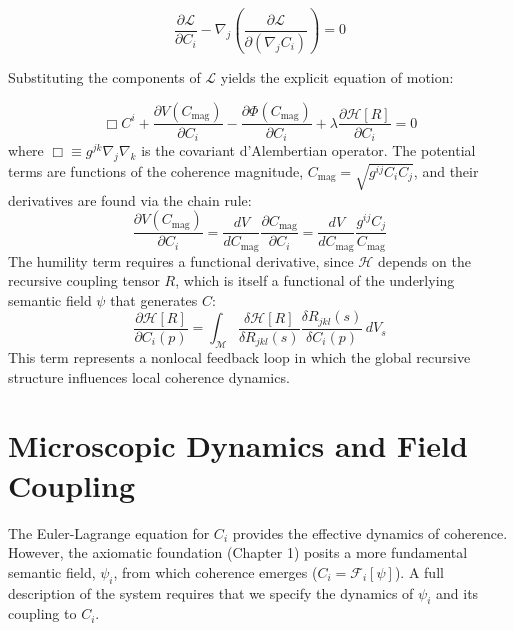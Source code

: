 \begin{equation}
\frac{\partial \mathcal{L}}{\partial C_i} - \nabla_j \left( \frac{\partial \mathcal{L}}{\partial (\nabla_j C_i)} \right) = 0
\end{equation}

Substituting the components of \(\mathcal{L}\) yields the explicit equation of motion:

\begin{equation}
\Box C^i + \frac{\partial V(C_{\mathrm{mag}})}{\partial C_i} - \frac{\partial \Phi(C_{\mathrm{mag}})}{\partial C_i} + \lambda \frac{\partial \mathcal{H}[R]}{\partial C_i} = 0
\end{equation}
where \(\Box \equiv g^{jk}\nabla_j \nabla_k\) is the covariant d'Alembertian operator. The potential terms are functions of the coherence magnitude, \(C_{\text{mag}} = \sqrt{g^{ij} C_i C_j}\), and their derivatives are found via the chain rule:
\begin{equation}
\frac{\partial V(C_{\mathrm{mag}})}{\partial C_i} = \frac{dV}{dC_{\mathrm{mag}}} \frac{\partial C_{\mathrm{mag}}}{\partial C_i} = \frac{dV}{dC_{\mathrm{mag}}} \frac{g^{ij} C_j}{C_{\mathrm{mag}}}
\end{equation}
The humility term requires a functional derivative, since \(\mathcal{H}\) depends on the recursive coupling tensor \(R\), which is itself a functional of the underlying semantic field \(\psi\) that generates \(C\):
\begin{equation}
\frac{\partial \mathcal{H}[R]}{\partial C_i(p)} = \int_{\mathcal{M}} \frac{\delta \mathcal{H}[R]}{\delta R_{jkl}(s)} \frac{\delta R_{jkl}(s)}{\delta C_i(p)} \, dV_s
\end{equation}
This term represents a nonlocal feedback loop in which the global recursive structure influences local coherence dynamics.


\section{Microscopic Dynamics and Field Coupling}
\label{sec:microscopic_dynamics_and_field_coupling}

The Euler-Lagrange equation for \(C_i\) provides the effective dynamics of coherence. However, the axiomatic foundation (Chapter 1) posits a more fundamental semantic field, \(\psi_i\), from which coherence emerges (\(C_i = \mathcal{F}_i[\psi]\)). A full description of the system requires that we specify the dynamics of \(\psi_i\) and its coupling to \(C_i\).

